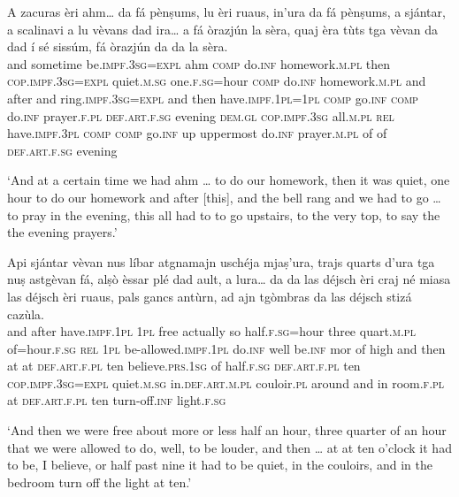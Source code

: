 \begin{linenumbers}
\gll    A zacuras    èri                      ahm…  da            fá            pènṣums,                  lu èri                      ruaus,                 in’ura                 da          fá             pènṣums,                 a   sjántar, a scalinavi                    a  lu vèvans                         dad          ira…           a              fá               òrazjún               la                  sèra,   quaj              èra                 tùts              tga          vèvan                   da           dad             í            sé sissúm,      fá            òrazjún               da da la                   sèra.\\
        and sometime be.\textsc{impf.3sg=expl} ahm \textsc{comp} do.\textsc{inf} homework.\textsc{m.pl} then \textsc{cop.impf.3sg=expl} quiet.\textsc{m.sg} one.\textsc{f.sg}=hour \textsc{comp} do.\textsc{inf} homework.\textsc{m.pl} and after and   ring.\textsc{impf.3sg=expl} and then have.\textsc{impf.1pl=1pl} \textsc{comp} go.\textsc{inf} \textsc{comp} do.\textsc{inf} prayer.\textsc{f.pl} \textsc{def.art.f.sg} evening \textsc{dem.gl} \textsc{cop.impf.3sg} all.\textsc{m.pl} \textsc{rel} have.\textsc{impf.3pl} \textsc{comp} \textsc{comp} go.\textsc{inf} up uppermost do.\textsc{inf} prayer.\textsc{m.pl} of of \textsc{def.art.f.sg} evening \\
\end{linenumbers}
\medskip
\glt `And at a certain time we had ahm … to do our homework, then it was quiet, one hour to do our homework and after [this], and the bell rang and we had to go … to pray in the evening, this all had to to go upstairs, to the very top, to say the the evening prayers.'
\medskip

\begin{linenumbers}
\gll    Api sjántar vèvan nus líbar atgnamajn uschéja mjaṣ’ura, trajs quarts d’ura tga nuṣ astgèvan fá, alṣò èssar plé dad ault, a lura… da da las déjsch èri craj né miasa las déjsch èri ruaus, pals gancs antùrn, ad ajn tgòmbras da las déjsch stizá cazùla.\\
and after have.\textsc{impf.1pl} \textsc{1pl} free actually so half.\textsc{f.sg=}hour three quart.\textsc{m.pl}  of=hour.\textsc{f.sg} \textsc{rel} \textsc{1pl} be-allowed.\textsc{impf.1pl}  do.\textsc{inf} well be.\textsc{inf} mor of high and then at at \textsc{def.art.f.pl} ten believe.\textsc{prs.1sg} of  half.\textsc{f.sg} \textsc{def.art.f.pl} ten \textsc{cop.impf.3sg=expl} quiet.\textsc{m.sg} in.\textsc{def.art.m.pl} couloir.\textsc{pl} around and in room.\textsc{f.pl} at \textsc{def.art.f.pl} ten turn-off.\textsc{inf} light.\textsc{f.sg}\\
\end{linenumbers}
\medskip
\glt `And then we were free about more or less half an hour, three quarter of an hour that we were allowed to do, well, to be louder, and then … at at ten o’clock it had to be, I believe, or half past nine it had to be quiet, in the couloirs, and in the bedroom turn off the light at ten.'
\medskip







